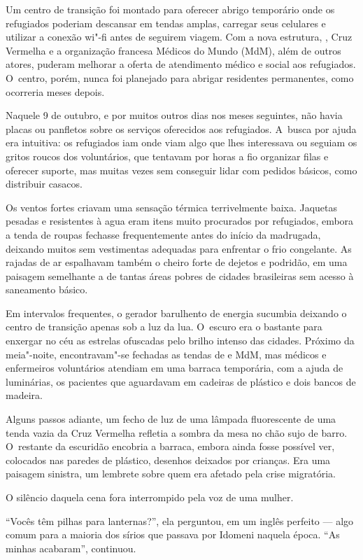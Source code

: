 Um centro de transição foi montado para oferecer abrigo temporário onde
os refugiados poderiam descansar em tendas amplas, carregar
seus celulares e utilizar a conexão wi"-fi antes de seguirem viagem. Com
a nova estrutura, , Cruz Vermelha e a organização francesa Médicos do
Mundo (MdM), além de outros atores, puderam melhorar a oferta de
atendimento médico e social aos refugiados. O~centro, porém, nunca foi
planejado para abrigar residentes permanentes, como ocorreria meses
depois.

Naquele 9 de outubro, e por muitos outros dias nos meses seguintes, não
havia placas ou panfletos sobre os serviços oferecidos aos refugiados. A~busca por ajuda era intuitiva: os refugiados iam onde viam algo que lhes
interessava ou seguiam os gritos roucos dos voluntários, que tentavam
por horas a fio organizar filas e oferecer suporte, mas muitas vezes sem
conseguir lidar com pedidos básicos, como distribuir casacos.

Os ventos fortes criavam uma sensação térmica terrivelmente baixa.
Jaquetas pesadas e resistentes à agua eram itens muito procurados por
refugiados, embora a tenda de roupas fechasse frequentemente antes do
início da madrugada, deixando muitos sem vestimentas adequadas para
enfrentar o frio congelante. As rajadas de ar espalhavam também o cheiro
forte de dejetos e podridão, em uma paisagem semelhante a de tantas
áreas pobres de cidades brasileiras sem acesso à saneamento básico.

Em intervalos frequentes, o gerador barulhento de energia sucumbia
deixando o centro de transição apenas sob a luz da lua. O~escuro era o
bastante para enxergar no céu as estrelas ofuscadas pelo brilho intenso
das cidades. Próximo da meia"-noite, encontravam"-se fechadas as tendas de
 e MdM, mas médicos e enfermeiros voluntários atendiam em uma barraca
temporária, com a ajuda de  luminárias, os pacientes que
aguardavam em cadeiras de plástico e dois bancos de madeira.

Alguns passos adiante, um fecho de luz de uma lâmpada fluorescente de uma tenda vazia da Cruz Vermelha refletia a sombra da mesa no chão sujo de barro. O~restante da escuridão encobria a barraca, embora ainda
fosse possível ver, colocados nas paredes de plástico, desenhos deixados
por crianças. Era uma paisagem sinistra, um lembrete sobre
quem era afetado pela crise migratória.

O silêncio daquela cena fora interrompido pela voz de uma mulher.

``Vocês têm pilhas para lanternas?'', ela perguntou, em um inglês
perfeito --- algo comum para a maioria dos sírios que passava por
Idomeni naquela época. ``As minhas acabaram'', continuou.

